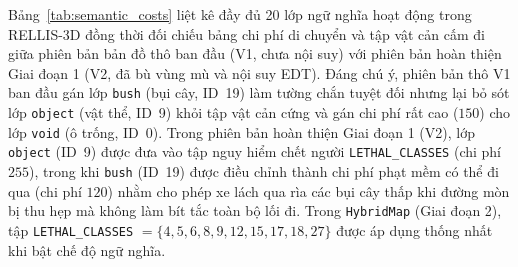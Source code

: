 \documentclass[a4paper,fleqn]{cas-sc}
\begin{document}
Bảng~\ref{tab:semantic_costs} liệt kê đầy đủ 20 lớp ngữ nghĩa hoạt động trong RELLIS-3D đồng thời đối chiếu bảng chi phí di chuyển và tập vật cản cấm đi giữa phiên bản bản đồ thô ban đầu (V1, chưa nội suy) với phiên bản hoàn thiện Giai đoạn 1 (V2, đã bù vùng mù và nội suy EDT). Đáng chú ý, phiên bản thô V1 ban đầu gán lớp \texttt{bush} (bụi cây, ID~19) làm tường chắn tuyệt đối nhưng lại bỏ sót lớp \texttt{object} (vật thể, ID~9) khỏi tập vật cản cứng và gán chi phí rất cao ($150$) cho lớp \texttt{void} (ô trống, ID~0). Trong phiên bản hoàn thiện Giai đoạn 1 (V2), lớp \texttt{object} (ID~9) được đưa vào tập nguy hiểm chết người \texttt{LETHAL\_CLASSES} (chi phí $255$), trong khi \texttt{bush} (ID~19) được điều chỉnh thành chi phí phạt mềm có thể đi qua (chi phí $120$) nhằm cho phép xe lách qua rìa các bụi cây thấp khi đường mòn bị thu hẹp mà không làm bít tắc toàn bộ lối đi. Trong \texttt{HybridMap} (Giai đoạn 2), tập \texttt{LETHAL\_CLASSES} $= \{4, 5, 6, 8, 9, 12, 15, 17, 18, 27\}$ được áp dụng thống nhất khi bật chế độ ngữ nghĩa.

\begin{table}[width=\linewidth,pos=htbp]
\caption{Bảng tra cứu 20 lớp ngữ nghĩa RELLIS-3D đối chiếu chi phí di chuyển giữa Bản đồ hoàn thiện Giai đoạn 1 (V2) và Bản đồ thô ban đầu (V1) ($0$: dễ đi nhất; $255$: vật cản cấm đi).}
\label{tab:semantic_costs}
\centering
{}
\end{table}
\end{document}
